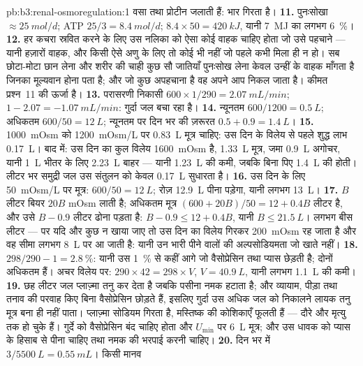 \begin{solution}{pb:b3:renal-osmoregulation:1}
वसा तथा प्रोटीन जलाती हैं: भार गिरता है।
\textbf{11.} पुनःसोखा $\approx \qty{25}{mol/d}$; ATP $25/3 =
\qty{8.4}{mol/d}$; $8.4\times 50 = \qty{420}{kJ}$, यानी \qty{7}{MJ} का
लगभग \qty{6}{\%}।
\textbf{12.} हर कचरा स्रवित करने के लिए उस नलिका को ऐसा कोई वाहक चाहिए
होता जो उसे पहचाने --- यानी हज़ारों वाहक, और किसी ऐसे अणु के लिए तो
कोई भी नहीं जो पहले कभी मिला ही न हो। सब छोटा-मोटा छान लेना और शरीर की
चाही कुछ सौ जातियाँ पुनःसोख लेना केवल उन्हीं के वाहक माँगता है जिनका
मूल्यवान होना पता है; और जो कुछ अपहचाना है वह अपने आप निकल जाता है।
कीमत प्रश्न~11 की ऊर्जा है।
\textbf{13.} परासरणी निकासी $600\times 1/290 = \qty{2.07}{mL/min}$;
 $1 - 2.07 = -\qty{1.07}{mL/min}$: गुर्दा जल बचा रहा है।
\textbf{14.} न्यूनतम $600/1200 = \qty{0.5}{L}$; अधिकतम $600/50 =
\qty{12}{L}$; न्यूनतम पर दिन भर की ज़रूरत $0.5 + 0.9 = \qty{1.4}{L}$।
\textbf{15.} \qty{1000}{mOsm} को \qty{1200}{mOsm/L} पर
\qty{0.83}{L} मूत्र चाहिए: उस दिन के विलेय से पहले शुद्ध लाभ
\qty{0.17}{L}। बाद में: उस दिन का कुल विलेय \qty{1600}{mOsm} है,
\qty{1.33}{L} मूत्र, जमा \qty{0.9}{L} अगोचर, यानी \qty{1}{L} भीतर के
लिए \qty{2.23}{L} बाहर --- यानी \qty{1.23}{L} की कमी, जबकि बिना पिए
\qty{1.4}{L} की होती। लीटर भर समुद्री जल उस संतुलन को केवल
\qty{0.17}{L} सुधारता है।
\textbf{16.} उस दिन के लिए \qty{50}{mOsm/L} पर मूत्र: $600/50 =
\qty{12}{L}$; रोज़ \qty{12.9}{L} पीना पड़ेगा, यानी लगभग \qty{13}{L}।
\textbf{17.} $B$ लीटर बियर $20B$ mOsm लाती है; अधिकतम मूत्र
$(600 + 20B)/50 = 12 + 0.4B$ लीटर है, और उसे $B - 0.9$
लीटर ढोना पड़ता है: $B - 0.9 \le 12 + 0.4B$, यानी $B \le \qty{21.5}{L}$।
लगभग बीस लीटर --- पर यदि और कुछ न खाया जाए तो उस दिन का विलेय गिरकर
\qty{200}{mOsm} रह जाता है और वह सीमा लगभग \qty{8}{L} पर आ जाती है:
यानी उन भारी पीने वालों की अल्पसोडियमता जो खाते नहीं।
\textbf{18.} $298/290 - 1 = \qty{2.8}{\%}$: यानी उस \qty{1}{\%} से कहीं
आगे जो वैसोप्रेसिन तथा प्यास छेड़ती है; दोनों अधिकतम हैं। अचर विलेय पर:
$290\times 42 = 298\times V$, $V = \qty{40.9}{L}$, यानी लगभग
\qty{1.1}{L} की कमी।
\textbf{19.} छह लीटर जल प्लाज़्मा तनु कर देता है जबकि पसीना नमक हटाता
है; और व्यायाम, पीड़ा तथा तनाव  की परवाह किए बिना
वैसोप्रेसिन छोड़ते हैं, इसलिए गुर्दा उस अधिक जल को निकालने लायक तनु
मूत्र बना ही नहीं पाता। प्लाज़्मा सोडियम गिरता है, मस्तिष्क की कोशिकाएँ
फूलती हैं --- दौरे और मृत्यु तक हो चुके हैं। गुर्दे को वैसोप्रेसिन बंद
चाहिए होता और $U_{\min}$ पर \qty{6}{L} मूत्र; और उस धावक को प्यास के
हिसाब से पीना चाहिए तथा नमक की भरपाई करनी चाहिए।
\textbf{20.} दिन भर में $3/5500\ \unit{L} = \qty{0.55}{mL}$। किसी मानव

\end{solution}
